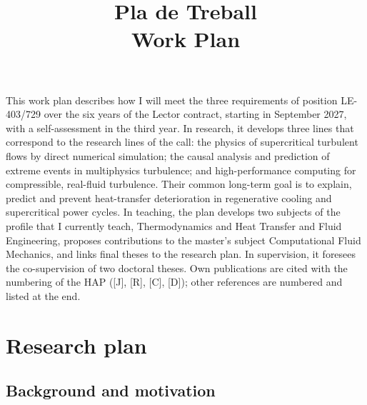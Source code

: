 \documentclass[11pt]{article}
\title{\textbf{Pla de Treball}\\[2pt]\large Work Plan}
\author{\Large \CandName}
\date{}
\begin{document}
\maketitle
\thispagestyle{plain}
\vspace{0.5cm}
\begin{center}\postdata\end{center}

This work plan describes how I will meet the three requirements of position LE-403/729
over the six years of the Lector contract, starting in September 2027, with a
self-assessment in the third year. In research, it develops three lines that correspond to
the research lines of the call: the physics of supercritical turbulent flows by direct
numerical simulation; the causal analysis and prediction of extreme events in multiphysics
turbulence; and high-performance computing for compressible, real-fluid turbulence. Their
common long-term goal is to explain, predict and prevent heat-transfer deterioration in
regenerative cooling and supercritical power cycles. In teaching, the plan develops two
subjects of the profile that I currently teach, Thermodynamics and Heat Transfer and Fluid
Engineering, proposes contributions to the master's subject Computational Fluid Mechanics,
and links final theses to the research plan. In supervision, it foresees the co-supervision
of two doctoral theses. Own publications are cited with the numbering of the HAP ([J], [R],
[C], [D]); other references are numbered and listed at the end.

\newpage
\tableofcontents

\section{Research plan}\label{sec:research}

\subsection{Background and motivation}\label{sec:background}
\end{document}

